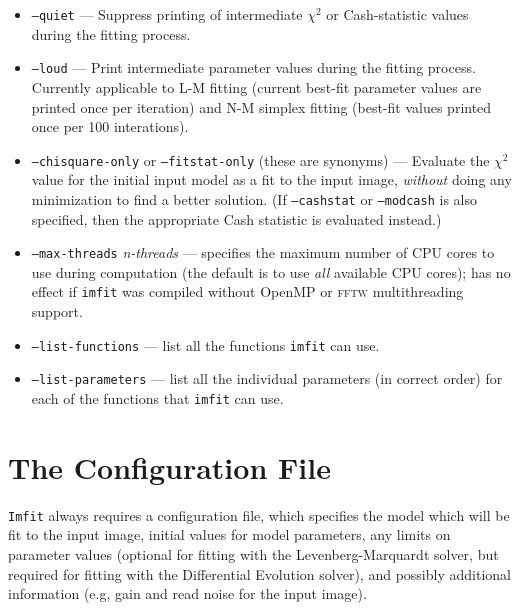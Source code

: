 \documentclass[10pt,a4paper,article]{memoir}
\newcommand{\imfit}{\texttt{imfit}}
\newcommand{\chisquare}{\ensuremath{\chi^{2}}}
\begin{document}
\begin{itemize}
\bigskip

\item \texttt{--quiet} --- Suppress printing of intermediate \chisquare{} or Cash-statistic values
during the fitting process.

\item \texttt{--loud} --- Print intermediate parameter values during the fitting
process. Currently applicable to L-M fitting (current best-fit parameter values are
printed once per iteration) and N-M simplex fitting (best-fit values printed once per 100 interations).

\bigskip

\item \texttt{--chisquare-only} or \texttt{--fitstat-only} (these are
synonyms) --- Evaluate the \chisquare{} value for the initial input
model as a fit to the input image, \textit{without} doing any
minimization to find a better solution. (If \texttt{--cashstat} or
\texttt{--modcash} is also specified, then the appropriate Cash
statistic is evaluated instead.)

\bigskip

\item \texttt{--max-threads} \textit{n-threads} --- specifies the maximum number of CPU cores to use
during computation (the default is to use \textit{all} available CPU cores); has no
effect if \imfit{} was compiled without OpenMP or \textsc{fftw} multithreading support.

\bigskip

\item \texttt{--list-functions} --- list all the functions \imfit{} can use.

\item \texttt{--list-parameters} --- list all the individual parameters (in correct order)
for each of the functions that \imfit{} can use.
\end{itemize}




\chapter{The Configuration File}\label{sec:configfile}

\texttt{Imfit} always requires a configuration file, which specifies the model
which will be fit to the input image, initial values for model parameters, any
limits on parameter values (optional for fitting with the Levenberg-Marquardt
solver, but required for fitting with the Differential Evolution solver), and
possibly additional information (e.g, gain and read noise for the input image).
\end{document}
